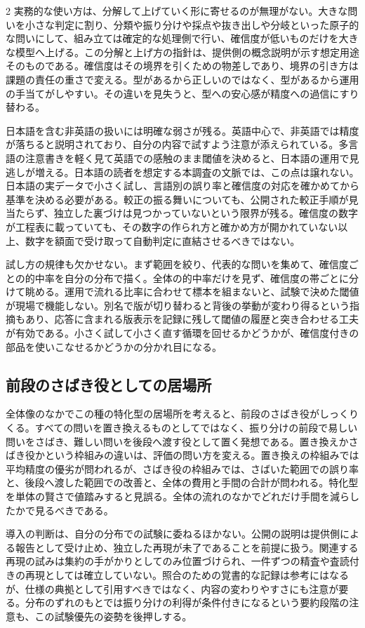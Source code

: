 \documentclass[lualatex,a4paper,10pt]{jlreq}
\begin{document}
\begin{multicols}{2}
実務的な使い方は、分解して上げていく形に寄せるのが無理がない。大きな問いを小さな判定に割り、分類や振り分けや採点や抜き出しや分岐といった原子的な問いにして、組み立ては確定的な処理側で行い、確信度が低いものだけを大きな模型へ上げる。この分解と上げ方の指針は、提供側の概念説明が示す想定用途そのものである\autocite{sysoneconcepts}。確信度はその境界を引くための物差しであり、境界の引き方は課題の責任の重さで変える。型があるから正しいのではなく、型があるから運用の手当てがしやすい。その違いを見失うと、型への安心感が精度への過信にすり替わる。

日本語を含む非英語の扱いには明確な弱さが残る。英語中心で、非英語では精度が落ちると説明されており、自分の内容で試すよう注意が添えられている\autocite{jevmodels}。多言語の注意書きを軽く見て英語での感触のまま閾値を決めると、日本語の運用で見逃しが増える。日本語の読者を想定する本調査の文脈では、この点は譲れない。日本語の実データで小さく試し、言語別の誤り率と確信度の対応を確かめてから基準を決める必要がある。較正の振る舞いについても、公開された較正手順が見当たらず、独立した裏づけは見つかっていないという限界が残る。確信度の数字が工程表に載っていても、その数字の作られ方と確かめ方が開かれていない以上、数字を額面で受け取って自動判定に直結させるべきではない。

試し方の規律も欠かせない。まず範囲を絞り、代表的な問いを集めて、確信度ごとの的中率を自分の分布で描く。全体の的中率だけを見ず、確信度の帯ごとに分けて眺める。運用で流れる比率に合わせて標本を組まないと、試験で決めた閾値が現場で機能しない。別名で版が切り替わると背後の挙動が変わり得るという指摘もあり、応答に含まれる版表示を記録に残して閾値の履歴と突き合わせる工夫が有効である\autocite{jevmodels}。小さく試して小さく直す循環を回せるかどうかが、確信度付きの部品を使いこなせるかどうかの分かれ目になる。

\subsection{前段のさばき役としての居場所}
全体像のなかでこの種の特化型の居場所を考えると、前段のさばき役がしっくりくる。すべての問いを置き換えるものとしてではなく、振り分けの前段で易しい問いをさばき、難しい問いを後段へ渡す役として置く発想である。置き換えかさばき役かという枠組みの違いは、評価の問い方を変える。置き換えの枠組みでは平均精度の優劣が問われるが、さばき役の枠組みでは、さばいた範囲での誤り率と、後段へ渡した範囲での改善と、全体の費用と手間の合計が問われる。特化型を単体の賢さで値踏みすると見誤る。全体の流れのなかでどれだけ手間を減らしたかで見るべきである。

導入の判断は、自分の分布での試験に委ねるほかない。公開の説明は提供側による報告として受け止め、独立した再現が未了であることを前提に扱う。関連する再現の試みは集約の手がかりとしてのみ位置づけられ、一件ずつの精査や査読付きの再現としては確立していない\autocite{awesomejev}。照合のための覚書的な記録は参考にはなるが、仕様の典拠として引用すべきではなく、内容の変わりやすさにも注意が要る\autocite{jevwiki}。分布のずれのもとでは振り分けの利得が条件付きになるという要約段階の注意も、この試験優先の姿勢を後押しする\autocite{fragility}。


\end{multicols}
\end{document}
